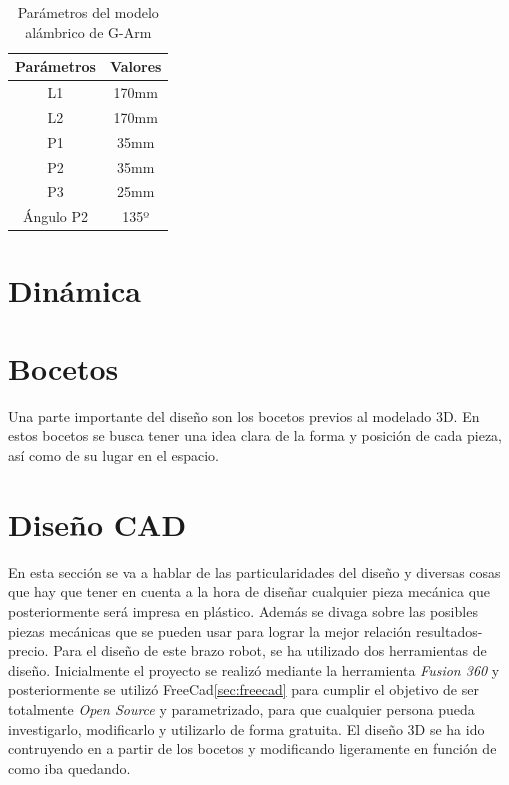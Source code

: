 \begin{table}[H]
\begin{center}
\begin{tabular}{|c|c|}
\hline
\textbf{Parámetros} & \textbf{Valores} \\
\hline
L1 & 170mm \\
L2 & 170mm \\
P1 & 35mm \\
P2 & 35mm \\
P3 & 25mm \\
Ángulo P2 & 135º \\
\hline
\end{tabular}
\caption{Parámetros del modelo alámbrico de G-Arm}
\label{cuadro:ejemplo}
\end{center}
\end{table}


\section{Dinámica}



\section{Bocetos}
Una parte importante del diseño son los bocetos previos al modelado 3D. En estos bocetos se busca tener una idea clara de la forma 
y posición de cada pieza, así como de su lugar en el espacio.

\section{Diseño CAD}
En esta sección se va a hablar de las particularidades del diseño y diversas cosas que hay que tener en cuenta a la hora de diseñar 
cualquier pieza mecánica que posteriormente será impresa en plástico. Además se divaga sobre las posibles piezas mecánicas que se 
pueden usar para lograr la mejor relación resultados-precio.
Para el diseño de este brazo robot, se ha utilizado dos herramientas de diseño. Inicialmente el proyecto se realizó mediante 
la herramienta \textit{Fusion 360} y posteriormente se utilizó FreeCad\ref{sec:freecad} para cumplir el objetivo de ser totalmente 
\textit{Open Source} y parametrizado, para que cualquier persona pueda investigarlo, modificarlo y utilizarlo de forma gratuita. 
El diseño 3D se ha ido contruyendo en a partir de los bocetos y modificando ligeramente en función de como iba quedando.


